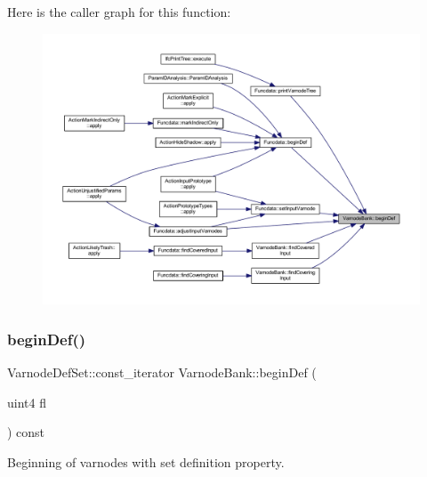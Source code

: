Here is the caller graph for this function\+:
\nopagebreak
\begin{figure}[H]
\begin{center}
\leavevmode
\includegraphics[width=350pt]{class_varnode_bank_a93884ad8b00531125e028acbb910aacc_icgraph}
\end{center}
\end{figure}
\mbox{\label{class_varnode_bank_a64420e8511a793ca45128d54a5766f03}} 
\subsubsection{\texorpdfstring{beginDef()}{beginDef()}\hspace{0.1cm}{\footnotesize\ttfamily [2/3]}}
{\footnotesize\ttfamily Varnode\+Def\+Set\+::const\+\_\+iterator Varnode\+Bank\+::begin\+Def (\begin{DoxyParamCaption}\item[{uint4}]{fl }\end{DoxyParamCaption}) const}



Beginning of varnodes with set definition property. 

